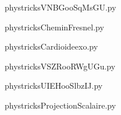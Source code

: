     \newcommand{\CaptionFigVNBGooSqMsGU}{<+Type your caption here+>}
    \begin{center}
        
    \end{center}
    phystricksVNBGooSqMsGU.py

    

    \clearpage
    


    \newcommand{\CaptionFigCheminFresnel}{<+Type your caption here+>}
    \begin{center}
        
    \end{center}
    phystricksCheminFresnel.py

    

    \clearpage
    


    \newcommand{\CaptionFigCardioideexo}{<+Type your caption here+>}
    \begin{center}
        
    \end{center}
    phystricksCardioideexo.py

    

    \clearpage
    


    \newcommand{\CaptionFigVSZRooRWgUGu}{<+Type your caption here+>}
    \begin{center}
        
    \end{center}
    phystricksVSZRooRWgUGu.py

    

    \clearpage
    


    \newcommand{\CaptionFigUIEHooSlbzIJ}{<+Type your caption here+>}
    \begin{center}
        
    \end{center}
    phystricksUIEHooSlbzIJ.py

    

    \clearpage
    


    \newcommand{\CaptionFigProjectionScalaire}{<+Type your caption here+>}
    \begin{center}
        
    \end{center}
    phystricksProjectionScalaire.py

